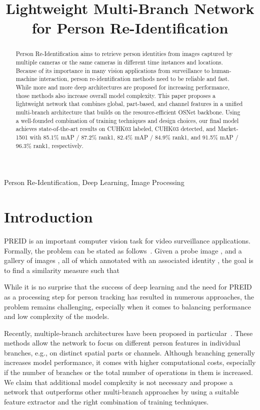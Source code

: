 \documentclass{article}
\title{Lightweight Multi-Branch Network for Person Re-Identification}
\begin{document}
\begin{acronym}
\end{acronym}

\maketitle
\begin{abstract}
Person Re-Identification aims to retrieve person identities from images captured by multiple cameras or the same cameras in different time instances and locations. Because of its importance in many vision applications from surveillance to human-machine interaction, person re-identification methods need to be reliable and fast. While more and more deep architectures are proposed for increasing performance, those methods also increase overall model complexity. This paper proposes a lightweight network that combines global, part-based, and channel features in a unified multi-branch architecture that builds on the resource-efficient OSNet backbone. Using a well-founded combination of training techniques and design choices, our final model achieves state-of-the-art results on CUHK03 labeled, CUHK03 detected, and Market-1501 with 85.1\% mAP / 87.2\% rank1, 82.4\% mAP / 84.9\% rank1, and 91.5\% mAP / 96.3\% rank1, respectively.
\end{abstract}
\begin{keywords}
Person Re-Identification, Deep Learning, Image Processing
\end{keywords}


\section{Introduction}
\label{sec:intro}
\ac{PREID} is an important computer vision task for video surveillance applications. Formally, the problem can be stated as follows~\cite{zheng2016person}. Given a probe image , and a gallery of  images , all of which annotated with an associated identity , the goal is to find a similarity measure  such that

 While it is no surprise that the success of deep learning and the need for \ac{PREID} as a processing step for person tracking has resulted in numerous approaches, the problem remains challenging, especially when it comes to balancing performance and low complexity of the models.


 Recently, multiple-branch architectures have been proposed in particular~\cite{wang2018learning,chen2020learning,chen2019mixed,chen2019abd,xie2020learning}. These methods allow the network to focus on different person features in individual branches, e.g., on distinct spatial parts or channels. Although branching generally increases model performance, it comes with higher computational costs, especially if the number of branches or the total number of operations in them is increased. We claim that additional model complexity is not necessary and propose a network that outperforms other multi-branch approaches  by using a suitable feature extractor and the right combination of training techniques.
\end{document}
